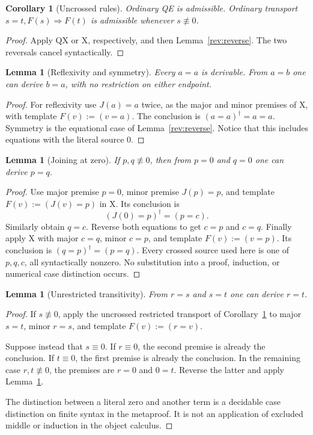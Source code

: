 \documentclass[11pt,letterpaper]{article}
\newtheorem{lemma}[theorem]{Lemma}
\newtheorem{corollary}[theorem]{Corollary}
\theoremstyle{definition}\newtheorem{definition}[theorem]{Definition}
\theoremstyle{remark}\newtheorem{remark}[theorem]{Remark}
\begin{document}
\begin{corollary}[Uncrossed rules]\label{rev:uncrossed}
Ordinary QE is admissible. Ordinary transport
$s=t,F(s)\Rightarrow F(t)$ is admissible whenever $s\not\equiv0$.
\end{corollary}
\begin{proof}
Apply QX or X, respectively, and then Lemma~\ref{rev:reverse}.
The two reversals cancel syntactically.
\end{proof}

\begin{lemma}[Reflexivity and symmetry]\label{rev:refl-symm}
Every $a=a$ is derivable. From $a=b$ one can derive $b=a$, with no
restriction on either endpoint.
\end{lemma}
\begin{proof}
For reflexivity use $J(a)=a$ twice, as the major and minor premises of X,
with template $F(v):=(v=a)$. The conclusion is $(a=a)^\dagger=a=a$.
Symmetry is the equational case of Lemma~\ref{rev:reverse}. Notice that
this includes equations with the literal source $0$.
\end{proof}

\begin{lemma}[Joining at zero]\label{rev:zero-join}
If $p,q\not\equiv0$, then from $p=0$ and $q=0$ one can derive $p=q$.
\end{lemma}
\begin{proof}
Use major premise $p=0$, minor premise $J(p)=p$, and template
$F(v):=(J(v)=p)$ in X. Its conclusion is
\[
                     (J(0)=p)^\dagger=(p=c).
\]
Similarly obtain $q=c$. Reverse both equations to get $c=p$ and
$c=q$. Finally apply X with major $c=q$, minor $c=p$, and template
$F(v):=(v=p)$. Its conclusion is $(q=p)^\dagger=(p=q)$.
Every crossed source used here is one of $p,q,c$, all syntactically
nonzero. No substitution into a proof, induction, or numerical case
distinction occurs.
\end{proof}

\begin{lemma}[Unrestricted transitivity]\label{rev:trans}
From $r=s$ and $s=t$ one can derive $r=t$.
\end{lemma}
\begin{proof}
If $s\not\equiv0$, apply the uncrossed restricted transport of
Corollary~\ref{rev:uncrossed} to major $s=t$, minor $r=s$, and
template $F(v):=(r=v)$.

Suppose instead that $s\equiv0$. If $r\equiv0$, the second premise is
already the conclusion. If $t\equiv0$, the first premise is already
the conclusion. In the remaining case $r,t\not\equiv0$, the premises
are $r=0$ and $0=t$. Reverse the latter and apply
Lemma~\ref{rev:zero-join}.

The distinction between a literal zero and another term is a decidable
case distinction on finite syntax in the metaproof. It is not an
application of excluded middle or induction in the object calculus.
\end{proof}
\end{document}
